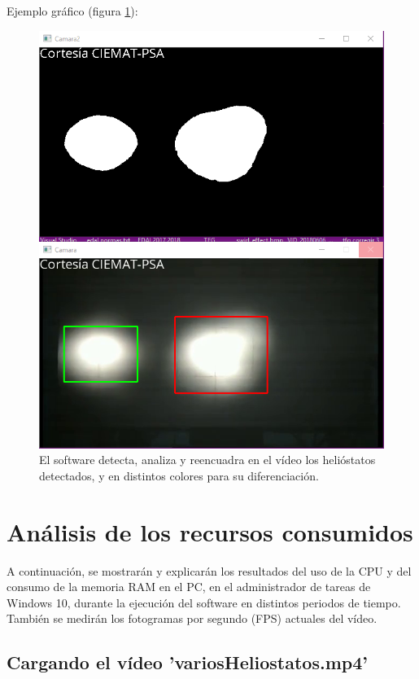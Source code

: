 Ejemplo gráfico (figura \ref{fig:CapturasEntradasYSalidas/unnamed(1).png}):

\begin{figure}[h!]
  	\centering
	\includegraphics[width=\textwidth]{CapturasEntradasYSalidas/unnamed(1).png}
	\caption{El software detecta, analiza y reencuadra en el vídeo los helióstatos detectados, y en distintos colores para su diferenciación.
	\label{fig:CapturasEntradasYSalidas/unnamed(1).png}}
\end{figure}

\section{Análisis de los recursos consumidos}

A continuación, se mostrarán y explicarán los resultados del uso de la CPU y del consumo de la memoria RAM en el PC, en el administrador de tareas de Windows 10, durante la ejecución del software en distintos periodos de tiempo. También se medirán los fotogramas por segundo (FPS) actuales del vídeo.

\subsection{Cargando el vídeo 'variosHeliostatos.mp4'}

